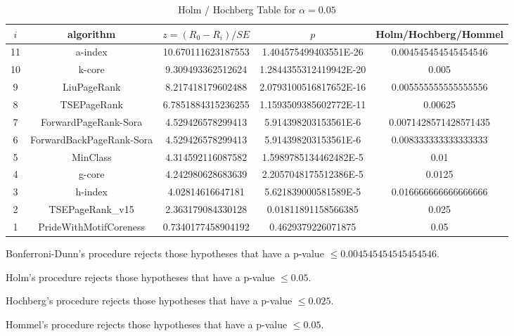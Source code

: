 \documentclass[a4paper,10pt]{article}
\begin{document}
\begin{landscape}
\begin{table}[!htp]
\centering\tiny
\caption{Holm / Hochberg Table for $\alpha=0.05$}
\begin{tabular}{ccccc}
$i$&algorithm&$z=(R_0 - R_i)/SE$&$p$&Holm/Hochberg/Hommel\\
\hline
11&a-index&10.670111623187553&1.404575499403551E-26&0.004545454545454546\\
10&k-core&9.309493362512624&1.2844355312419942E-20&0.005\\
9&LiuPageRank&8.217418179602488&2.0793100516817652E-16&0.005555555555555556\\
8&TSEPageRank&6.7851884315236255&1.1593509385602772E-11&0.00625\\
7&ForwardPageRank-Sora&4.529426578299413&5.914398203153561E-6&0.0071428571428571435\\
6&ForwardBackPageRank-Sora&4.529426578299413&5.914398203153561E-6&0.008333333333333333\\
5&MinClass&4.314592116087582&1.5989785134462482E-5&0.01\\
4&g-core&4.242980628683639&2.2057048175512386E-5&0.0125\\
3&h-index&4.02814616647181&5.621839000581589E-5&0.016666666666666666\\
2&TSEPageRank_v15&2.363179084330128&0.01811891158566385&0.025\\
1&PrideWithMotifCoreness&0.7340177458904192&0.4629379226071875&0.05\\
\hline
\end{tabular}
\end{table}
Bonferroni-Dunn's procedure rejects those hypotheses that have a p-value $\le0.004545454545454546$.


Holm's procedure rejects those hypotheses that have a p-value $\le0.05$.


Hochberg's procedure rejects those hypotheses that have a p-value $\le0.025$.


Hommel's procedure rejects those hypotheses that have a p-value $\le0.05$.



\end{landscape}
\end{document}
